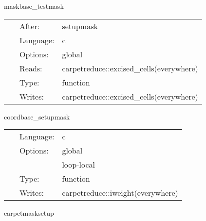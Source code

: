 \vspace{5mm}


\hspace{5mm} maskbase\_testmask 

\hspace{5mm}{\it test the weight function } 


\hspace{5mm}

 \begin{tabular*}{160mm}{cll} 
~ & After:  & setupmask \\ 
~ & Language:  & c \\ 
~ & Options:  & global \\ 
~ & Reads:  & carpetreduce::excised\_cells(everywhere) \\ 
~ & Type:  & function \\ 
~ & Writes:  & carpetreduce::excised\_cells(everywhere) \\ 
\end{tabular*} 


\vspace{5mm}


\hspace{5mm} coordbase\_setupmask 

\hspace{5mm}{\it set up the outer boundaries of the weight function } 


\hspace{5mm}

 \begin{tabular*}{160mm}{cll} 
~ & Language:  & c \\ 
~ & Options:  & global \\ 
~& ~ &loop-local\\ 
~ & Type:  & function \\ 
~ & Writes:  & carpetreduce::iweight(everywhere) \\ 
\end{tabular*} 


\vspace{5mm}


\hspace{5mm} carpetmasksetup 

\hspace{5mm}{\it set up the weight function for the restriction regions } 


